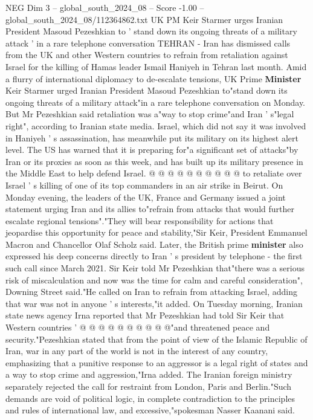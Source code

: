\begin{textsample}{NEG Dim 3 – global\_south\_2024\_08 – Score -1.00 – global\_south\_2024\_08/112364862.txt}  \label{ex:f3_neg_158}
UK PM Keir Starmer urges Iranian President Masoud Pezeshkian to ' stand down its ongoing threats of a military attack ' in a rare telephone conversation TEHRAN - Iran has dismissed calls from the UK and other Western countries to refrain from retaliation against Israel for the killing of Hamas leader Ismail Haniyeh in Tehran last month.
Amid a flurry of international diplomacy to de-escalate tensions, UK Prime \textbf{Minister} Keir Starmer urged Iranian President Masoud Pezeshkian to"stand down its ongoing threats of a military attack"in a rare telephone conversation on Monday.
But Mr Pezeshkian said retaliation was a"way to stop crime"and Iran ' s"legal right", according to Iranian state media.
Israel, which did not say it was involved in Haniyeh ' s assassination, has meanwhile put its military on its highest alert level.
The US has warned that it is preparing for"a significant set of attacks"by Iran or its proxies as soon as this week, and has built up its military presence in the Middle East to help defend Israel. @ @ @ @ @ @ @ @ @ @ to retaliate over Israel ' s killing of one of its top commanders in an air strike in Beirut.
On Monday evening, the leaders of the UK, France and Germany issued a joint statement urging Iran and its allies to"refrain from attacks that would further escalate regional tensions"."They will bear responsibility for actions that jeopardise this opportunity for peace and stability,"Sir Keir, President Emmanuel Macron and Chancellor Olaf Scholz said.
Later, the British prime \textbf{minister} also expressed his deep concerns directly to Iran ' s president by telephone - the first such call since March 2021.
Sir Keir told Mr Pezeshkian that"there was a serious risk of miscalculation and now was the time for calm and careful consideration", Downing Street said."He called on Iran to refrain from attacking Israel, adding that war was not in anyone ' s interests,"it added.
On Tuesday morning, Iranian state news agency Irna reported that Mr Pezeshkian had told Sir Keir that Western countries ' @ @ @ @ @ @ @ @ @ @"and threatened peace and security."Pezeshkian stated that from the point of view of the Islamic Republic of Iran, war in any part of the world is not in the interest of any country, emphasizing that a punitive response to an aggressor is a legal right of states and a way to stop crime and aggression,"Irna added.
The Iranian foreign ministry separately rejected the call for restraint from London, Paris and Berlin."Such demands are void of political logic, in complete contradiction to the principles and rules of international law, and excessive,"spokesman Nasser Kaanani said.

\end{textsample}
